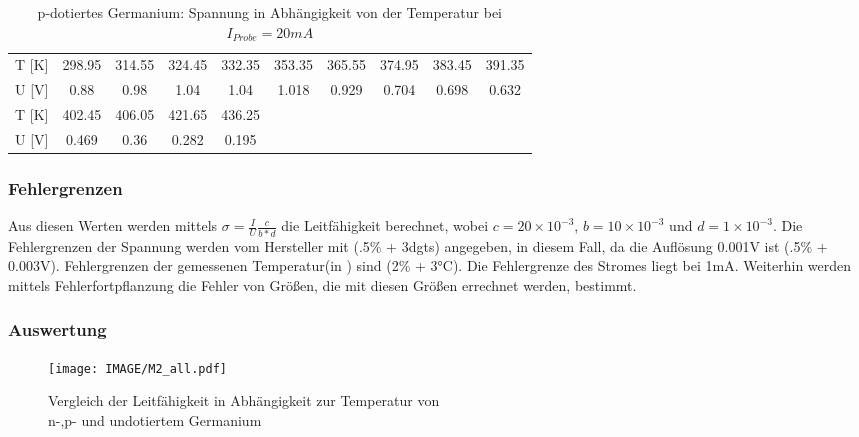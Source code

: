 \begin{table}[H]
\centering
\begin{tabular}{|c||c|c|c|c|c|c|c|c|c|}
\hline
T [K] & 298.95 & 314.55 & 324.45 & 332.35 & 353.35 & 365.55 & 374.95 & 383.45 & 391.35 \\
 U [V] & 0.88 & 0.98 & 1.04 & 1.04 & 1.018 & 0.929 & 0.704 & 0.698 & 0.632 \\
 \hline
 T [K]& 402.45
   & 406.05 & 421.65 & 436.25 & & & & & \\
U [V] & 0.469 & 0.36 & 0.282
   & 0.195 & & & & & \\
 \hline
\end{tabular}
\caption{p-dotiertes Germanium: Spannung in Abhängigkeit von der Temperatur bei $I_{Probe}=20mA$}
\end{table} 

\subsubsection{Fehlergrenzen}
Aus diesen Werten werden mittels $\sigma=\frac{I}{U}\frac{c}{b *d}$ die Leitfähigkeit berechnet, wobei $c=20 \times 10^{-3}$, $b=10 \times 10^{-3}$ und $d=1 \times 10^{-3}$. Die Fehlergrenzen der Spannung werden vom Hersteller mit (.5\% + 3dgts) angegeben, in diesem Fall, da die Auflösung 0.001V ist (.5\% + 0.003V). Fehlergrenzen der gemessenen Temperatur(in \celsius) sind (2\% + 3°C). Die Fehlergrenze des Stromes liegt bei 1mA. Weiterhin werden mittels Fehlerfortpflanzung die Fehler von Größen, die mit diesen Größen errechnet werden, bestimmt.\\

\subsubsection{Auswertung}
\begin{figure}[H]
	\centering
\texttt{[image: IMAGE/M2\_all.pdf]}
	\caption{Vergleich der Leitfähigkeit in Abhängigkeit zur Temperatur von\\ n-,p- und undotiertem Germanium}
	\label{fig:M2_1}
\end{figure} 

